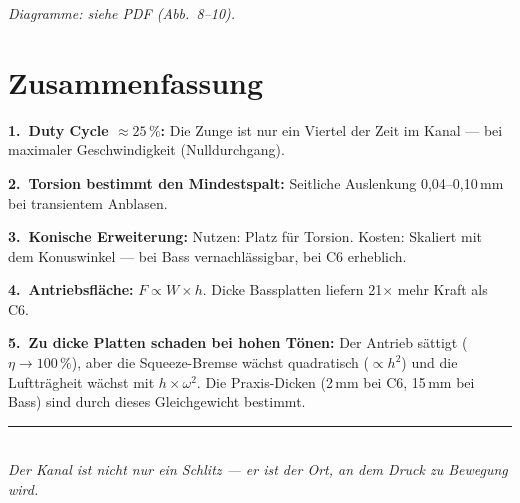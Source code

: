 \documentclass[11pt,a4paper]{article}
\begin{document}
\textit{Diagramme: siehe PDF (Abb.~8--10).}

\section{Zusammenfassung}

\begin{keybox}
\textbf{1.\ Duty Cycle $\approx 25\,\%$:} Die Zunge ist nur ein Viertel der Zeit im Kanal --- bei maximaler Geschwindigkeit (Nulldurchgang).

\textbf{2.\ Torsion bestimmt den Mindestspalt:} Seitliche Auslenkung 0,04--0,10\,mm bei transientem Anblasen.

\textbf{3.\ Konische Erweiterung:} Nutzen: Platz für Torsion. Kosten: Skaliert mit dem Konuswinkel --- bei Bass vernachlässigbar, bei C6 erheblich.

\textbf{4.\ Antriebsfläche:} $F \propto W \times h$. Dicke Bassplatten liefern 21$\times$ mehr Kraft als C6.

\textbf{5.\ Zu dicke Platten schaden bei hohen Tönen:} Der Antrieb sättigt ($\eta \to 100\,\%$), aber die Squeeze-Bremse wächst quadratisch ($\propto h^2$) und die Luftträgheit wächst mit $h \times \omega^2$. Die Praxis-Dicken (2\,mm bei C6, 15\,mm bei Bass) sind durch dieses Gleichgewicht bestimmt.
\end{keybox}

\vspace{3mm}
\begin{center}
\textcolor{accentred}{\rule{0.6\textwidth}{1pt}}\\[4pt]
{\small\itshape Der Kanal ist nicht nur ein Schlitz --- er ist der Ort, an dem Druck zu Bewegung wird.}
\end{center}
\end{document}
